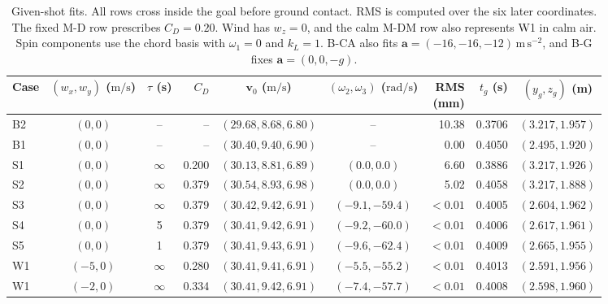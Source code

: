 \begin{table}[!htbp]
\centering
\caption{Given-shot fits. All rows cross inside the goal before ground contact. RMS is computed over the six later coordinates. The fixed M-D row prescribes \(C_D=0.20\). Wind has \(w_z=0\), and the calm M-DM row also represents W1 in calm air. Spin components use the chord basis with \(\omega_1=0\) and \(k_L=1\). B-CA also fits \(\mathbf a=(-16,-16,-12)\,\mathrm{m\,s^{-2}}\), and B-G fixes \(\mathbf a=(0,0,-g)\).}
\label{tab:part6-shot}
\scriptsize
\setlength{\tabcolsep}{2.25pt}
\begin{tabular}{@{}lccrccrrc@{}}
\toprule
Case & \shortstack{\((w_x,w_y)\)\\(\(\mathrm{m/s}\))} & \shortstack{\(\tau\)\\(s)} & \(C_D\) & \shortstack{\(\mathbf v_0\)\\(\(\mathrm{m/s}\))} & \shortstack{\((\omega_2,\omega_3)\)\\(\(\mathrm{rad/s}\))} & \shortstack{RMS\\(mm)} & \shortstack{\(t_g\)\\(s)} & \shortstack{\((y_g,z_g)\)\\(m)} \\
\midrule
B2 & \((0,0)\) & -- & -- & \((29.68,8.68,6.80)\) & -- & 10.38 & 0.3706 & \((3.217,1.957)\) \\
B1 & \((0,0)\) & -- & -- & \((30.40,9.40,6.90)\) & -- & 0.00 & 0.4050 & \((2.495,1.920)\) \\
S1 & \((0,0)\) & \(\infty\) & 0.200 & \((30.13,8.81,6.89)\) & \((0.0,0.0)\) & 6.60 & 0.3886 & \((3.217,1.926)\) \\
S2 & \((0,0)\) & \(\infty\) & 0.379 & \((30.54,8.93,6.98)\) & \((0.0,0.0)\) & 5.02 & 0.4058 & \((3.217,1.888)\) \\
S3 & \((0,0)\) & \(\infty\) & 0.379 & \((30.42,9.42,6.91)\) & \((-9.1,-59.4)\) & \(<0.01\) & 0.4005 & \((2.604,1.962)\) \\
S4 & \((0,0)\) & 5 & 0.379 & \((30.41,9.42,6.91)\) & \((-9.2,-60.0)\) & \(<0.01\) & 0.4006 & \((2.617,1.961)\) \\
S5 & \((0,0)\) & 1 & 0.379 & \((30.41,9.43,6.91)\) & \((-9.6,-62.4)\) & \(<0.01\) & 0.4009 & \((2.665,1.955)\) \\
W1 & \((-5,0)\) & \(\infty\) & 0.280 & \((30.41,9.41,6.91)\) & \((-5.5,-55.2)\) & \(<0.01\) & 0.4013 & \((2.591,1.956)\) \\
W1 & \((-2,0)\) & \(\infty\) & 0.334 & \((30.41,9.42,6.91)\) & \((-7.4,-57.7)\) & \(<0.01\) & 0.4008 & \((2.598,1.960)\) \\

\end{tabular}
\end{table}
